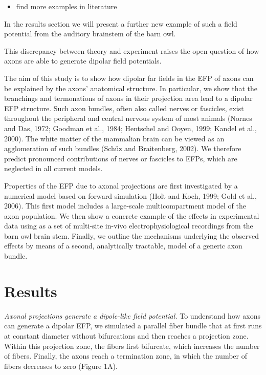 \documentclass[]{article}
\providecommand{\tightlist}{%
  \setlength{\itemsep}{0pt}\setlength{\parskip}{0pt}}
\begin{document}
\begin{itemize}
\tightlist
\item
  find more examples in literature
\end{itemize}

In the results section we will present a further new example of such a
field potential from the auditory brainstem of the barn owl.

This discrepancy between theory and experiment raises the open question
of how axons are able to generate dipolar field potentials.

The aim of this study is to show how dipolar far fields in the EFP of
axons can be explained by the axons' anatomical structure. In
particular, we show that the branchings and termonations of axons in
their projection area lead to a dipolar EFP structure. Such axon
bundles, often also called nerves or fascicles, exist throughout the
peripheral and central nervous system of most animals (Nornes and Das,
1972; Goodman et al., 1984; Hentschel and Ooyen, 1999; Kandel et al.,
2000). The white matter of the mammalian brain can be viewed as an
agglomeration of such bundles (Schüz and Braitenberg, 2002). We
therefore predict pronounced contributions of nerves or fascicles to
EFPs, which are neglected in all current models.

Properties of the EFP due to axonal projections are first investigated
by a numerical model based on forward simulation (Holt and Koch, 1999;
Gold et al., 2006). This first model includes a large-scale
multicompartment model of the axon population. We then show a concrete
example of the effects in experimental data using as a set of multi-site
in-vivo electrophysiological recordings from the barn owl brain stem.
Finally, we outline the mechanisms underlying the observed effects by
means of a second, analytically tractable, model of a generic axon
bundle.

\section{Results}\label{results}

\emph{Axonal projections generate a dipole-like field potential.} To
understand how axons can generate a dipolar EFP, we simulated a parallel
fiber bundle that at first runs at constant diameter without
bifurcations and then reaches a projection zone. Within this projection
zone, the fibers first bifurcate, which increases the number of fibers.
Finally, the axons reach a termination zone, in which the number of
fibers decreases to zero (Figure 1A).
\end{document}
